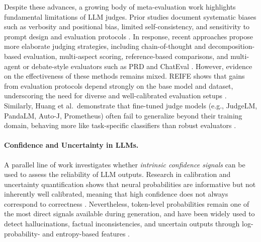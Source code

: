 \documentclass[11pt]{article}
\begin{document}
Despite these advances, a growing body of meta-evaluation work highlights fundamental limitations of LLM judges. Prior studies document systematic biases such as verbosity and positional bias, limited self-consistency, and sensitivity to prompt design and evaluation protocols \cite{wang2023large, zeng2024llmbar, zheng2023judging, liu2023geval}. In response, recent approaches propose more elaborate judging strategies, including chain-of-thought and decomposition-based evaluation, multi-aspect scoring, reference-based comparisons, and multi-agent or debate-style evaluators such as PRD and ChatEval \cite{gong2023coascore, saha2023branch, li2023prd, chan2024chateval, jeong2024prepair}. However, evidence on the effectiveness of these methods remains mixed. REIFE shows that gains from evaluation protocols depend strongly on the base model and dataset, underscoring the need for diverse and well-calibrated evaluation setups \cite{liu2025reife}. Similarly, Huang et al.\ demonstrate that fine-tuned judge models (e.g., JudgeLM, PandaLM, Auto-J, Prometheus) often fail to generalize beyond their training domain, behaving more like task-specific classifiers than robust evaluators \cite{huang2025empirical}. 


\paragraph{Confidence and Uncertainty in LLMs.}
A parallel line of work investigates whether \emph{intrinsic confidence signals} can be used to assess the reliability of LLM outputs. Research in calibration and uncertainty quantification shows that neural probabilities are informative but not inherently well calibrated, meaning that high confidence does not always correspond to correctness \cite{desai2020calibration, kadavath2022language, kuhn2023semantic}. Nevertheless, token-level probabilities remain one of the most direct signals available during generation, and have been widely used to detect hallucinations, factual inconsistencies, and uncertain outputs through log-probability- and entropy-based features \cite{liu2022token, manakul2023selfcheckgpt, mallen2023whennottrust}. 
\end{document}
